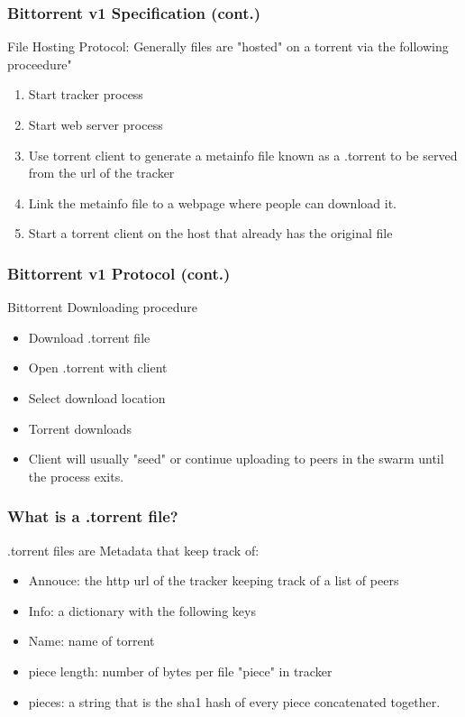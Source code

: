 \documentclass{beamer}
\begin{document}
\begin{frame}
\frametitle{Bittorrent v1 Specification (cont.)}
\begin{block}{File Hosting Protocol:}
Generally files are "hosted" on a torrent via the following proceedure"
\begin{enumerate}
\item Start tracker process 
\item Start web server  process
\item Use torrent client to generate a metainfo file known as a .torrent to be served from the url of the tracker
\item Link the metainfo file to a webpage where people can download it. 
\item Start a torrent client on the host that already has the original file 
\end{enumerate}
\end{block}
\end{frame}
\begin{frame}
\frametitle{Bittorrent v1 Protocol (cont.)}
\begin{block}{Bittorrent Downloading procedure}
\begin{itemize}
\item Download .torrent file
\item Open .torrent with client 
\item Select download location
\item Torrent downloads 
\item Client will usually "seed" or continue uploading to peers in the swarm until the process exits.
\end{itemize}
\end{block}
\end{frame}
\begin{frame}
\frametitle{What is a .torrent file?}
\begin{block}{.torrent files are Metadata that keep track of:}
\begin{itemize}
\item Annouce: the http url of the tracker keeping track of a list of peers
\item Info: a dictionary with the following keys
\item Name: name of torrent
\item piece length: number of bytes per file "piece" in tracker
\item pieces: a string that is the sha1 hash of every piece concatenated together.
\end{itemize}
\end{block}
\end{frame}
\end{document}
